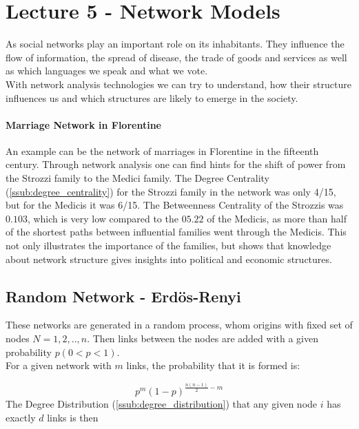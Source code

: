\section{Lecture 5 - Network Models} %
\label{sec:lecture_5_network_models}
As social networks play an important role on its inhabitants.
They influence the flow of information,
the spread of disease,
the trade of goods and services as well as which languages we speak and what we vote.\\
With network analysis technologies we can try to understand,
how their structure influences us
and which structures are likely to emerge in the society.

\paragraph{Marriage Network in Florentine} %
\label{par:marriage_network_in_florentine}
	An example can be the network of marriages in Florentine in the fifteenth century.
	Through network analysis one can find hints for the shift of power from the 
	Strozzi family to the Medici family.
	The Degree Centrality (\ref{ssub:degree_centrality}) for the Strozzi family in the network
	was only 4/15, but for the Medicis it was 6/15.
	The Betweenness Centrality of the Strozzis was $0.103$,
	which is very low compared to the $05.22$ of the Medicis,
	as more than half of the shortest paths between influential families went through the Medicis.
	This not only illustrates the importance of the families,
	but shows that knowledge about network structure gives insights into political and economic structures.

\subsection[Random Network]{Random Network - Erd\"os-Renyi\\} %
\label{ssub:erdoes-renyi}
These networks are generated in a random process,
whom origins with fixed set of nodes $N = {1,2,..,n}$.
Then links between the nodes are added with a given probability $p (0 < p < 1)$.\\
For a given network with $m$ links,
the probability that it is formed is:

\begin{equation}
\label{eq:erdoesrenyiprob}
	p^m (1 - p)^{\frac{n(n-1)}{2}-m}
\end{equation}
The Degree Distribution (\ref{ssub:degree_distribution})
that any given node $i$ has exactly $d$ links is then

